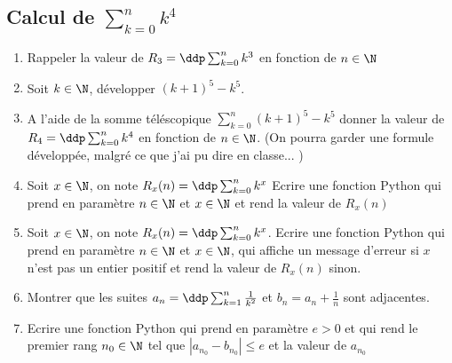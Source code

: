 
\subsection{Calcul de $\sum_{k=0}^n k^4$ }

\begin{exercice}
\begin{enumerate}
\item Rappeler  la valeur  de $ R_3=\ddp \sum_{k=0}^n k^3$ en fonction de $n\in \N$
\item Soit $k\in \N$, développer $(k+1)^5 -k^5$. 
\item A l'aide de la  somme téléscopique  $\sum_{k=0}^n(k+1)^5 -k^5$ donner la valeur de 
$R_4= \ddp \sum_{k=0}^n k^4$  en fonction de $n\in \N$.  (On pourra garder une formule développée, malgré ce que j'ai pu dire en classe... ) 
\item Soit $x\in \N$, on note $R_x(n) =  \ddp \sum_{k=0}^n k^x$
Ecrire une fonction Python qui prend en paramètre $n\in \N $ et $x\in \N $  et rend la valeur de $R_x(n)$
\item Soit $x\in \N$, on note $R_x(n) =  \ddp \sum_{k=0}^n k^x$. 
Ecrire une fonction Python qui prend en paramètre $n\in \N $ et $x\in \N $, qui affiche un message d'erreur si $x$ n'est pas un entier positif et rend la valeur de $R_x(n)$ sinon. 

\item Montrer que les suites $ a_n=\ddp \sum_{k=1}^n \frac{1}{k^2}$  et $b_n= a_n + \frac{1}{n}$ sont adjacentes. 

\item  Ecrire une fonction   Python qui prend en paramètre $e>0$ et qui rend le premier rang $n_0\in \N$ tel que $\left|a_{n_0}-b_{n_0}\right| \leq e$
et la valeur de $a_{n_0}$
\end{enumerate}
\end{exercice}

